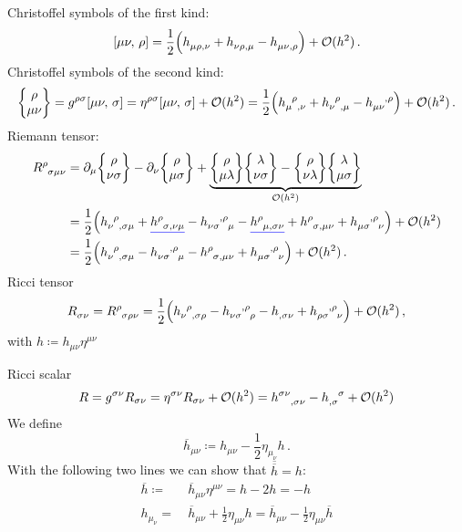 Christoffel symbols of the first kind:
\begin{equation}
    \csym{\mu}{\nu}{\rho} = \frac{1}{2} \left( \tensor{h}{_\mu_\rho_,_\nu} + \tensor{h}{_\nu_\rho_,_\mu}
    - \tensor{h}{_\mu_\nu_,_\rho} \right) + \landauO(h^2) \, .
\end{equation}
Christoffel symbols of the second kind:
\begin{equation}
    \cSym{\rho}{\mu}{\nu} = g^{\rho\sigma} \csym{\mu}{\nu}{\sigma} = \eta^{\rho\sigma} \csym{\mu}{\nu}{\sigma} + \landauO(h^2)
    = \frac{1}{2} \left( \tensor{h}{_\mu^\rho_,_\nu} + \tensor{h}{_\nu^\rho_,_\mu} - \tensor{h}{_\mu_\nu^,^\rho} \right) + \landauO(h^2) \, .
\end{equation}
Riemann tensor:
\begin{equation}
    \begin{split}
        \tensor{R}{^\rho_\sigma_\mu_\nu}
        &= \partial_\mu \cSym{\rho}{\nu}{\sigma} - \partial_\nu \cSym{\rho}{\mu}{\sigma}
        + \underbrace{\cSym{\rho}{\mu}{\lambda} \cSym{\lambda}{\nu}{\sigma} - \cSym{\rho}{\nu}{\lambda} \cSym{\lambda}{\mu}{\sigma}}_{\landauO(h^2)} \\
        &= \frac{1}{2} \left( \tensor{h}{_\nu^\rho_,_\sigma_\mu} + \mathunderline{blue}{\tensor{h}{^\rho_\sigma_,_\nu_\mu}} - \tensor{h}{_\nu_\sigma^,^\rho_\mu}
        - \mathunderline{blue}{\tensor{h}{^\rho_\mu_,_\sigma_\nu}} + \tensor{h}{^\rho_\sigma_,_\mu_\nu} + \tensor{h}{_\mu_\sigma^,^\rho_\nu} \right) + \landauO(h^2) \\
        &= \frac{1}{2} \left( \tensor{h}{_\nu^\rho_,_\sigma_\mu} - \tensor{h}{_\nu_\sigma^,^\rho_\mu}
        - \tensor{h}{^\rho_\sigma_,_\mu_\nu} + \tensor{h}{_\mu_\sigma^,^\rho_\nu} \right) + \landauO(h^2) \, .
    \end{split}
\end{equation}
Ricci tensor
\begin{equation}
    \tensor{R}{_\sigma_\nu} = \tensor{R}{^\rho_\sigma_\rho_\nu}
    = \frac{1}{2} \left( \tensor{h}{_\nu^\rho_,_\sigma_\rho} - \tensor{h}{_\nu_\sigma^,^\rho_\rho}
    - \tensor{h}{_,_\sigma_\nu} + \tensor{h}{_\rho_\sigma^,^\rho_\nu} \right) + \landauO(h^2)\, ,
\end{equation}
with $h\coloneqq h_{\mu\nu}\eta^{\mu\nu}$

Ricci scalar
\begin{equation}
    R = g^{\sigma\nu}R_{\sigma\nu} = \eta^{\sigma\nu}R_{\sigma\nu} + \landauO(h^2)
    = \tensor{h}{^\sigma^\nu_,_\sigma_\nu} - \tensor{h}{_,_\sigma^\sigma} + \landauO(h^2)
\end{equation}
We define
\begin{equation}
    \overline{h}_{\mu\nu} \coloneqq h_{\mu\nu} - \frac{1}{2} \eta_{\mu_\nu}h\,.
\end{equation}
With the following two lines we can show that $\overline{\overline{h}} = h$:
\begin{align}
    \overline{h} \coloneqq &\ \overline{h}_{\mu\nu}\eta^{\mu\nu} = h - 2h = -h \\
    h_{\mu_\nu} =&\ \overline{h}_{\mu\nu} + \frac{1}{2} \eta_{\mu\nu}h = \overline{h}_{\mu\nu} - \frac{1}{2} \eta_{\mu\nu}\overline{h}
\end{align}

